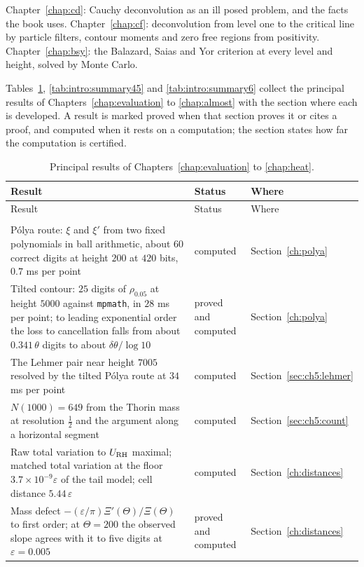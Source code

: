 Chapter~\ref{chap:cd}: Cauchy deconvolution as an ill posed problem, and the facts the book uses. Chapter~\ref{chap:cf}: deconvolution from level one to the critical line by particle filters, contour moments and zero free regions from positivity. Chapter~\ref{chap:bsy}: the Balazard, Saias and Yor criterion at every level and height, solved by Monte Carlo.

Tables~\ref{tab:intro:summary}, \ref{tab:intro:summary45} and \ref{tab:intro:summary6} collect the principal results of Chapters~\ref{chap:evaluation} to \ref{chap:almost} with the section where each is developed. A result is marked proved when that section proves it or cites a proof, and computed when it rests on a computation; the section states how far the computation is certified.

{\footnotesize
\begin{longtable}{p{}p{}p{}}
\toprule
Result & Status & Where\\
\midrule
\endfirsthead
\toprule
Result & Status & Where\\
\midrule
\endhead
\bottomrule
\endfoot
\bottomrule
\caption{Principal results of Chapters~\ref{chap:evaluation} to \ref{chap:heat}.}\label{tab:intro:summary}\\
\endlastfoot
P\'olya route: $\xi$ and $\xi'$ from two fixed polynomials in ball arithmetic, about $60$ correct digits at height $200$ at $420$ bits, $0.7$ ms per point & \raggedright computed & Section~\ref{ch:polya}\\
Tilted contour: $25$ digits of $\rho_{0.05}$ at height $5000$ against \texttt{mpmath}, in $28$ ms per point; to leading exponential order the loss to cancellation falls from about $0.341\,\theta$ digits to about $\delta\theta/\log10$ & \raggedright proved and computed & Section~\ref{ch:polya}\\
The Lehmer pair near height $7005$ resolved by the tilted P\'olya route at $34$ ms per point & \raggedright computed & Section~\ref{sec:ch5:lehmer}\\
$N(1000)=649$ from the Thorin mass at resolution $\frac12$ and the argument along a horizontal segment & \raggedright computed & Section~\ref{sec:ch5:count}\\
Raw total variation to $U_{\mathrm{RH}}$ maximal; matched total variation at the floor $3.7\times10^{-9}\varepsilon$ of the tail model; cell distance $5.44\,\varepsilon$ & \raggedright computed & Section~\ref{ch:distances}\\
Mass defect $-(\varepsilon/\pi)\Xi'(\Theta)/\Xi(\Theta)$ to first order; at $\Theta=200$ the observed slope agrees with it to five digits at $\varepsilon=0.005$ & \raggedright proved and computed & Section~\ref{ch:distances}\\

\end{longtable}}
